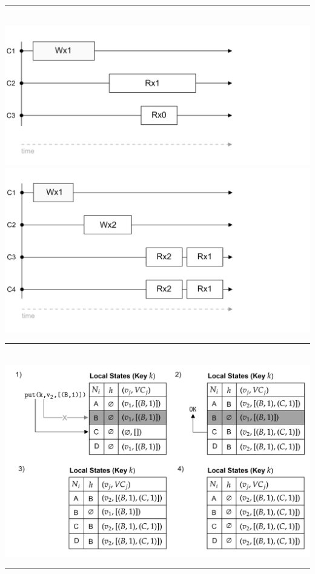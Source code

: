 \begin{multicols}{2}
\vspace{-2em}

\noindent
\rule{\linewidth}{0.4pt}\\
\hspace{-1.5em}
\includegraphics[width=\linewidth]{Sections/consist/cas1.png}\\

\vspace{-3em}
\hspace{-2.5em}
\includegraphics[width=\linewidth]{Sections/consist/seq1.png}\\
\noindent
\rule{\linewidth}{0.4pt}\\

\hspace{-1.5em}
\includegraphics[width=\linewidth]{Sections/dyn/vc_2.png}\\
\noindent
\rule{\linewidth}{0.4pt}\\


\end{multicols}
